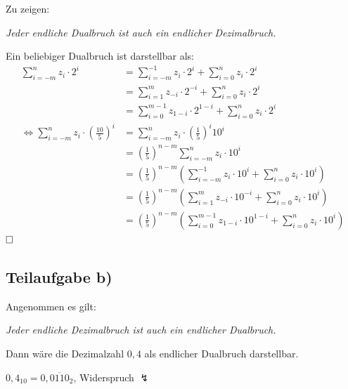 \documentclass{llncs}
\begin{document}
Zu zeigen: 
\begin{center}
\textit{Jeder endliche Dualbruch ist auch ein endlicher Dezimalbruch.}
\end{center}
Ein beliebiger Dualbruch ist darstellbar als:
\begin{align*}
\sum_{i=-m}^{n} z_{i} \cdot 2^{i} &= \sum_{i=-m}^{-1} z_{i} \cdot 2^{i} + \sum_{i=0}^{n} z_{i} \cdot 2^{i} \\
                                  &= \sum_{i=1}^{m} z_{-i} \cdot 2^{-i} + \sum_{i=0}^{n} z_{i} \cdot 2^{i} \\
                                  &= \sum_{i=0}^{m-1} z_{1-i} \cdot 2^{1-i} + \sum_{i=0}^{n} z_{i} \cdot 2^{i}\\
\Leftrightarrow \sum_{i=-m}^{n} z_{i} \cdot \left( \frac{10}{5} \right)^{i} &= \sum_{i=-m}^{n} z_{i} \cdot \left(\frac{1}{5}\right)^{i} 10^{i} \\
                                  &= \left(\frac{1}{5}\right)^{n-m} \sum_{i=-m}^{n} z_{i} \cdot 10^{i} \\
                                  &= \left(\frac{1}{5}\right)^{n-m} \left( \sum_{i=-m}^{-1} z_{i} \cdot 10^{i} + \sum_{i=0}^{n} z_{i} \cdot 10^{i} \right) \\
                                  &= \left(\frac{1}{5}\right)^{n-m} \left( \sum_{i=1}^{m} z_{-i} \cdot 10^{-i} + \sum_{i=0}^{n} z_{i} \cdot 10^{i} \right) \\
                                  &= \left(\frac{1}{5}\right)^{n-m} \left( \sum_{i=0}^{m-1} z_{1-i} \cdot 10^{1-i} + \sum_{i=0}^{n} z_{i} \cdot 10^{i} \right)
\end{align*}
$\hfill \square$


\subsection*{Teilaufgabe b)}

Angenommen es gilt:
\begin{center}
\textit{Jeder endliche Dezimalbruch ist auch ein endlicher Dualbruch.}
\end{center}
Dann w\"are die Dezimalzahl $0,4$ als endlicher Dualbruch darstellbar.
\begin{center}
$0,4_{10} = 0,\overline{0110}_2$, Widerspruch $\lightning$
\end{center}
\end{document}
